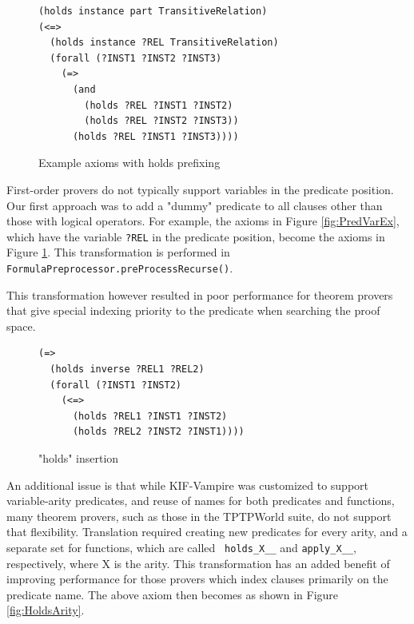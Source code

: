 \documentclass{book}
\begin{document}
\begin{figure}
\begin{framed}
\begin{verbatim}
(holds instance part TransitiveRelation)
(<=>
  (holds instance ?REL TransitiveRelation)
  (forall (?INST1 ?INST2 ?INST3)
    (=>
      (and
        (holds ?REL ?INST1 ?INST2)
        (holds ?REL ?INST2 ?INST3))
      (holds ?REL ?INST1 ?INST3))))
\end{verbatim}
\caption{Example axioms with holds prefixing}
\label{fig:HoldsPrefix}
\end{framed}
\end{figure}

\begin{sloppypar}
First-order provers do not typically support variables in the predicate
position. Our first approach was to add a "dummy" predicate to all clauses other
than those with logical operators.   For example, the axioms in Figure
\ref{fig:PredVarEx}, which have the variable {\tt ?REL} in the predicate
position, become the axioms in Figure \ref{fig:HoldsPrefix}.  This transformation
is performed in \texttt{FormulaPreprocessor.preProcessRecurse()}.
\end{sloppypar}

This transformation however resulted in poor performance for theorem provers
that give special indexing priority to the predicate when searching the proof
space.

\begin{figure}
\begin{framed}
\begin{verbatim}
(=>
  (holds inverse ?REL1 ?REL2)
  (forall (?INST1 ?INST2)
    (<=>
      (holds ?REL1 ?INST1 ?INST2)
      (holds ?REL2 ?INST2 ?INST1))))
\end{verbatim}
\caption{"holds" insertion}
\label{fig:HoldsInsert}
\end{framed}
\end{figure}

An additional issue is that while KIF-Vampire was customized to support
variable-arity predicates, and reuse of names for both predicates and functions,
many theorem provers, such as those in the TPTPWorld suite, do not support that
flexibility.  Translation required creating new predicates for every
arity, and a separate set for functions, which are called {\tt
holds\_X\_\_} and {\tt apply\_X\_\_}, respectively, where X is the arity.  This
transformation has an added benefit of improving performance for those provers
which index clauses primarily on the predicate name.  The above axiom then
becomes as shown in Figure \ref{fig:HoldsArity}.
\end{document}
